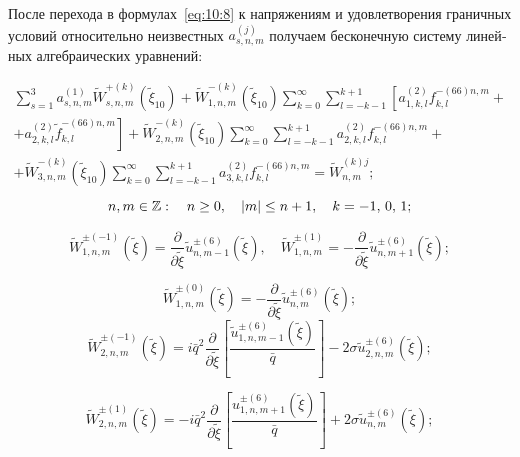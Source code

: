 \begin{russian}
После перехода в формулах~\eqref{eq:10:8} к напряжениям и удовлетворения граничных условий относительно неизвестных $a_{s,n,m}^{(j)}$ получаем бесконечную систему линейных алгебраических уравнений:

\begin{multline}
\sum\limits_{s = 1}^3 {a_{s,n,m}^{(1)}} \tilde W_{s,n,m}^{ + (k)}({\tilde \xi _{10}}) + \tilde W_{1,n,m}^{ - (k)}({\tilde \xi _{10}})\sum\limits_{k = 0}^\infty  {\sum\limits_{l =  - k - 1}^{k + 1} {\left[ {a_{1,k,l}^{(2)}f_{k,l}^{ - (66)n,m} + } \right.} } \\
\left. { + a_{2,k,l}^{(2)}\tilde f_{k,l}^{ - (66)n,m}} \right] + \tilde W_{2,n,m}^{ - (k)}({\tilde \xi _{10}})\sum\limits_{k = 0}^\infty  {\sum\limits_{l =  - k - 1}^{k + 1} {a_{2,k,l}^{(2)}} } f_{k,l}^{ - (66)n,m} + \\
+ \tilde W_{3,n,m}^{ - (k)}({\tilde \xi _{10}})\sum\limits_{k = 0}^\infty  {\sum\limits_{l =  - k - 1}^{k + 1} {a_{3,k,l}^{(2)}} } f_{k,l}^{ - (66)n,m} = \tilde W_{n,m}^{(k)j};
\end{multline}
$$
n,m \in\mathbb{Z}:\quad n \ge 0,\quad |m| \le n + 1,\quad k =  - 1,{\mkern 1mu} {\kern 1pt} 0,{\mkern 1mu} {\kern 1pt} 1;
$$

\begin{equation}
\tilde W_{1,n,m}^{ \pm ( - 1)}(\tilde \xi ) = \frac{\partial }{{\partial \tilde \xi }}\tilde u_{n,m - 1}^{ \pm (6)}(\tilde \xi ),\quad \tilde W_{1,n,m}^{ \pm (1)} =  - \frac{\partial }{{\partial \tilde \xi }}\tilde u_{n,m + 1}^{ \pm (6)}(\tilde \xi );
\end{equation}

\begin{equation}
\tilde W_{1,n,m}^{ \pm (0)}(\tilde \xi ) =  - \frac{\partial }{{\partial \tilde \xi }}\tilde u_{n,m}^{ \pm (6)}(\tilde \xi );
\end{equation}
\begin{equation}
\tilde W_{2,n,m}^{ \pm ( - 1)}(\tilde \xi ) = i{\bar q^2}\frac{\partial }{{\partial \tilde \xi }}\left[ {\frac{{\tilde u_{1,n,m - 1}^{ \pm (6)}(\tilde \xi )}}{{\bar q}}} \right] - 2\sigma \tilde u_{2,n,m}^{ \pm (6)}(\tilde \xi );
\end{equation}

\begin{equation}
\tilde W_{2,n,m}^{ \pm (1)}(\tilde \xi ) =  - i{\bar q^2}\frac{\partial }{{\partial \tilde \xi }}\left[ {\frac{{u_{1,n,m + 1}^{ \pm (6)}(\tilde \xi )}}{{\bar q}}} \right] + 2\sigma \tilde u_{n,m}^{ \pm (6)}(\tilde \xi );
\end{equation}


\end{russian}

